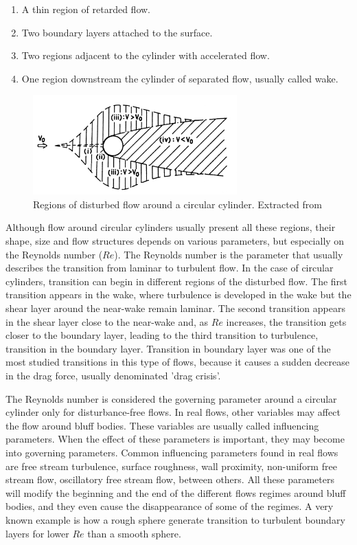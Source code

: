 \documentclass[journal]{new-aiaa}
\begin{document}
\begin{enumerate}[label=(\roman*)]
\item A thin region of retarded flow.
\item Two boundary layers attached to the surface.
\item Two regions adjacent to the cylinder with accelerated flow.
\item One region downstream the cylinder of separated flow, usually called wake.  
\end{enumerate} 

\begin{figure}[H]
\begin{center}
\includegraphics[width=0.7\textwidth]{Images/federico/Figure01}
\caption{ Regions of disturbed flow around a circular cylinder. Extracted from \cite{Zdravkovich1997} }
\label{fig:RegionsFlow}
\end{center}
\end{figure}

Although flow around circular cylinders usually present all these regions, their shape, size and flow structures depends on various parameters, but especially on the Reynolds number ($Re$). The Reynolds number is the parameter that usually describes the transition from laminar to turbulent flow. In the case of circular cylinders, transition can begin in different regions of the disturbed flow. The first transition appears in the wake, where turbulence is developed in the wake but the shear layer around the near-wake remain laminar. The second transition appears in the shear layer close to the near-wake and, as $Re$ increases, the transition gets closer to the boundary layer, leading to the third transition to turbulence, transition in the boundary layer. Transition in boundary layer was one of the most studied transitions in this type of flows, because it causes a sudden decrease in the drag force, usually denominated 'drag crisis'.

The Reynolds number is considered the governing parameter around a circular cylinder only for disturbance-free flows. In real flows, other variables may affect the flow around bluff bodies. These variables are usually called influencing parameters. When the effect of these parameters is important, they may become into governing parameters. Common influencing parameters found in real flows are free stream turbulence, surface roughness, wall proximity, non-uniform free stream flow, oscillatory free stream flow, between others. All these parameters will modify the beginning and the end of the different flows regimes around bluff bodies, and they even cause the disappearance of some of the regimes. A very known example is how a rough sphere generate transition to turbulent boundary layers for lower $Re$ than a smooth sphere.
\end{document}
